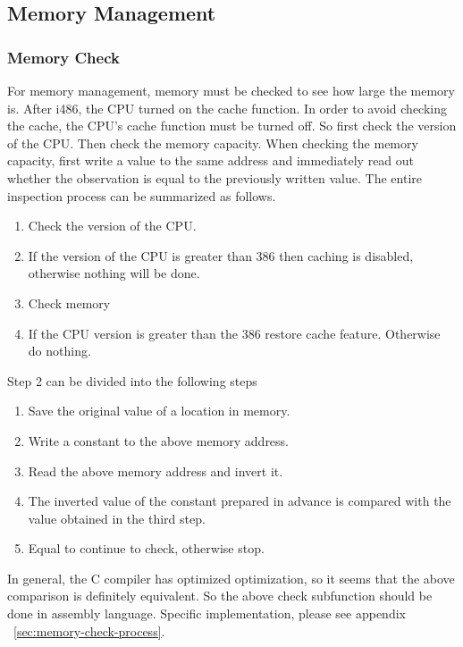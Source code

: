 \documentclass{swfcthesis}
\begin{document}
\subsection{Memory Management}
\label{sec:memory-management-2}

\subsubsection{Memory Check}
\label{sec:memory-check}

For memory management, memory must be checked to see how large the memory is. After i486,
the CPU turned on the cache function. In order to avoid checking the cache, the CPU's
cache function must be turned off. So first check the version of the CPU. Then check the
memory capacity. When checking the memory capacity, first write a value to the same
address and immediately read out whether the observation is equal to the previously
written value. The entire inspection process can be summarized as follows.
\begin{enumerate}
\item Check the version of the CPU.
\item If the version of the CPU is greater than 386 then caching is disabled, otherwise
  nothing will be done.
  
\item Check memory
\item If the CPU version is greater than the 386 restore cache feature. Otherwise do
  nothing.
\end{enumerate}
Step 2 can be divided into the following steps
\begin{enumerate}
\item Save the original value of a location in memory.
\item Write a constant to the above memory address.
\item Read the above memory address and invert it.
\item The inverted value of the constant prepared in advance is compared with the value
  obtained in the third step.
\item Equal to continue to check, otherwise stop.
\end{enumerate}
In general, the C compiler has optimized optimization, so it seems that the above
comparison is definitely equivalent. So the above check subfunction should be done in
assembly language. Specific implementation, please see appendix
~\ref{sec:memory-check-process}.
\end{document}

